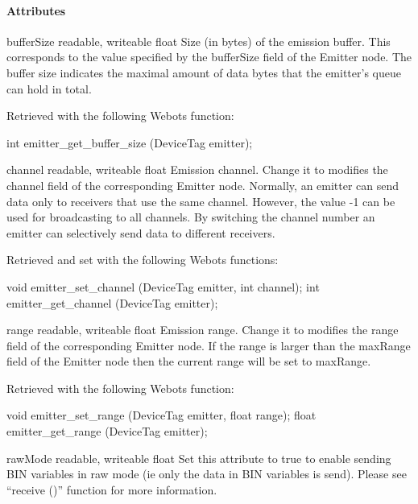 \paragraph{Attributes}

\noindent
\begin{itemize}
\begin{attribute}{bufferSize}
  {readable, writeable}
  {float}
  {}
  Size (in bytes) of the emission buffer. This
  corresponds to the value specified by the bufferSize field of the
  Emitter node. The buffer size indicates the maximal amount of data
  bytes that the emitter's queue can hold in total.

  Retrieved with the following Webots function:

\begin{cxx}
int emitter_get_buffer_size  (DeviceTag emitter);
\end{cxx}
\end{attribute}

\begin{attribute}{channel}
  {readable, writeable}
  {float}
  {}
  Emission channel. Change it to modifies the channel
  field of the corresponding Emitter node. Normally, an emitter can
  send data only to receivers that use the same channel. However, the
  value -{}1 can be used for broadcasting to all channels. By
  switching the channel number an emitter can selectively send data to
  different receivers.

  Retrieved and set with the following Webots functions:
\begin{cxx}
void emitter_set_channel  (DeviceTag emitter, int channel);
int emitter_get_channel (DeviceTag emitter);
\end{cxx}
\end{attribute}

\begin{attribute}{range}
  {readable, writeable}
  {float}
  {}
  Emission range. Change it to modifies the range field of
 the corresponding Emitter node. If the range is larger than the
 maxRange field of the Emitter node then the current range will be set
 to maxRange.

 Retrieved with the following Webots function:

\begin{cxx}
void emitter_set_range  (DeviceTag emitter, float range);
float emitter_get_range (DeviceTag emitter);
\end{cxx}
\end{attribute}

\begin{attribute}{rawMode}
  {readable, writeable}
  {float}
  {}
  Set this attribute to true to enable sending BIN
 variables in raw mode (ie only the data in BIN variables is
 send). Please see ``receive ()'' function for more information.
\end{attribute}
\end{itemize}

